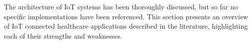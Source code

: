 
The architecture of \acs{IoT} systems has been thoroughly discussed, but so far no specific implementations have been referenced. This section presents an overview of \acs{IoT} connected healthcare applications described in the literature, highlighting each of their strengths and weaknesses. \bigskip

%

